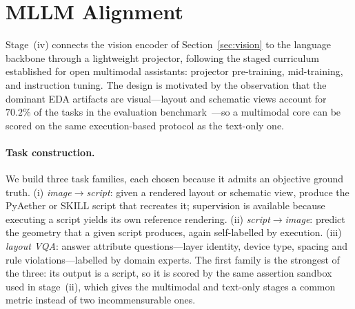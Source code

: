 ﻿\section{MLLM Alignment}\label{sec:mllm}

Stage~(iv) connects the vision encoder of Section~\ref{sec:vision} to the language backbone through a lightweight projector, following the staged curriculum established for open multimodal assistants: projector pre-training, mid-training, and instruction tuning.
The design is motivated by the observation that the dominant EDA artifacts are visual---layout and schematic views account for $70.2\%$ of the tasks in the evaluation benchmark~\cite{liu2026zhulong}---so a multimodal core can be scored on the same execution-based protocol as the text-only one.

\paragraph{Task construction.}
We build three task families, each chosen because it admits an objective ground truth.
(i) \emph{image$\to$script}: given a rendered layout or schematic view, produce the PyAether or SKILL script that recreates it; supervision is available because executing a script yields its own reference rendering.
(ii) \emph{script$\to$image}: predict the geometry that a given script produces, again self-labelled by execution.
(iii) \emph{layout VQA}: answer attribute questions---layer identity, device type, spacing and rule violations---labelled by domain experts.
The first family is the strongest of the three: its output is a script, so it is scored by the same assertion sandbox used in stage~(ii), which gives the multimodal and text-only stages a common metric instead of two incommensurable ones.

